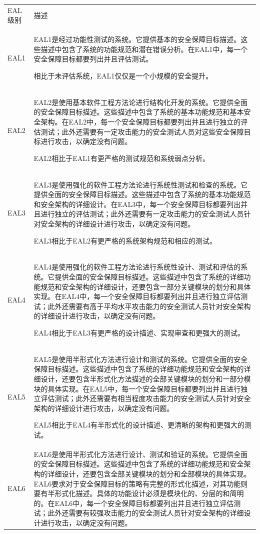 {\def\LTcaptype{none} %
\begin{longtable}[]{@{}
  >{\raggedright\arraybackslash}p{}
  >{\raggedright\arraybackslash}p{}@{}}
\toprule\noalign{}
\endhead
\bottomrule\noalign{}
\endlastfoot
EAL级别 & 描述 \\
EAL1 &
EAL1是经过功能性测试的系统。它提供基本的安全保障目标描述。这些描述中包含了系统的功能规范和潜在错误分析。在EAL1中，每一个安全保障目标都要列出并且评估测试。

相比于未评估系统，EAL1仅仅是一个小规模的安全提升。 \\
EAL2 &
EAL2是使用基本软件工程方法论进行结构化开发的系统。它提供全面的安全保障目标描述。这些描述中包含了系统的基本功能规范和基本安全架构。在EAL2中，每一个安全保障目标都要列出并且进行独立的评估测试；此外还需要有一定攻击能力的安全测试人员对这些安全保障目标进行攻击，以确定没有问题。

EAL2相比于EAL1有更严格的测试规范和系统弱点分析。 \\
EAL3 &
EAL3是使用强化的软件工程方法论进行系统性测试和检查的系统。它提供全面的安全保障目标描述。这些描述中包含了系统的基本功能规范和安全架构的详细设计。在EAL3中，每一个安全保障目标都要列出并且进行独立的评估测试；此外还需要有一定攻击能力的安全测试人员针对安全架构的详细设计进行攻击，以确定没有问题。

EAL3相比于EAL2有更严格的系统架构规范和相应的测试。 \\
EAL4 &
EAL4是使用强化的软件工程方法论进行系统性设计、测试和评估的系统。它提供全面的安全保障目标描述。这些描述中包含了系统的详细功能规范和安全架构的详细设计，还要包含一部分关键模块的划分和具体实现。在EAL4中，每一个安全保障目标都要列出并且进行独立评估测试；此外还需要有高于平均水平攻击能力的安全测试人员针对安全架构的详细设计进行攻击，以确定没有问题。

EAL4相比于EAL3有更严格的设计描述、实现审查和更强大的测试。 \\
EAL5 &
EAL5是使用半形式化方法进行设计和测试的系统。它提供全面的安全保障目标描述。这些描述中包含了系统的详细功能规范和安全架构的详细设计，还要包含半形式化方法描述的全部关键模块的划分和一部分模块的具体实现。在EAL5中，每一个安全保障目标都要列出并且进行独立评估测试；此外还需要有相当程度攻击能力的安全测试人员针对安全架构的详细设计进行攻击，以确定没有问题。

EAL5相比于EAL4有半形式化的设计描述、更清晰的架构和更强大的测试。 \\
EAL6 &
EAL6是使用半形式化方法进行设计、测试和验证的系统。它提供全面的安全保障目标描述。这些描述中包含了系统的详细功能规范和安全架构的详细设计，还要包含全部关键模块的划分和全部模块的具体实现。EAL6要求对于安全保障目标的策略有完整的形式化描述，对其功能则要有半形式化描述。具体的功能设计必须是模块化的、分层的和简明的。在EAL6中，每一个安全保障目标都要列出并且进行独立评估测试；此外还需要有较强攻击能力的安全测试人员针对安全架构的详细设计进行攻击，以确定没有问题。


\end{longtable}}
